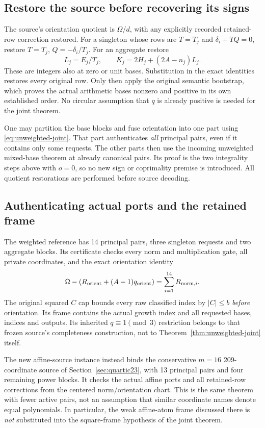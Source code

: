\subsection{Restore the source before recovering its signs}
The source's orientation quotient is $\Omega/d$, with any explicitly recorded
retained-row correction restored. For a singleton whose rows are
$T=T_j$ and $\delta_i+TQ=0$, restore $T=T_j$, $Q=-\delta_i/T_j$.
For an aggregate restore
\[
 L_j=E_j/T_j,\qquad K_j=2H_j+(2A-n_j)L_j.
\]
These are integers also at zero or unit bases. Substitution in the exact
identities restores every original row. Only then apply the original
semantic bootstrap, which proves the actual arithmetic bases nonzero and
positive in its own established order. No circular assumption that $q$ is
already positive is needed for the joint theorem.

One may partition the base blocks and fuse orientation into one part using
\eqref{eq:unweighted-joint}. That part authenticates \emph{all} principal
pairs, even if it contains only some requests. The other parts then use the
incoming unweighted mixed-base theorem at already canonical pairs. Its
proof is the two integrality steps above with $o=0$, so no new sign or
coprimality premise is introduced. All quotient restorations are performed
before source decoding.

\subsection{Authenticating actual ports and the retained frame}
The weighted reference has 14 principal pairs, three singleton requests and
two aggregate blocks. Its certificate checks every norm and multiplication
gate, all private coordinates, and the exact orientation identity
\[
 \Omega-(R_{\rm orient}+(A-1)q_{\rm orient})
       =\sum_{i=1}^{14}R_{{\rm norm},i}.
\]
The original squared $C$ cap bounds every raw classified index by $|C|\le b$
\emph{before} orientation. Its frame contains the actual growth index and
all requested bases, indices and outputs. Its inherited $q\equiv1\pmod3$
restriction belongs to that frozen source's completeness construction, not
to Theorem~\ref{thm:unweighted-joint} itself.

The new affine-source instance instead binds the conservative $m=16$
209-coordinate source of Section~\ref{sec:quartic23}, with 13 principal
pairs and four remaining power blocks. It checks the actual affine ports
and all retained-row corrections from the centered norm/orientation chart.
This is the same theorem with fewer active pairs, not an assumption that
similar coordinate names denote equal polynomials. In particular, the
weak affine-atom frame discussed there is \emph{not} substituted into the
square-frame hypothesis of the joint theorem.


